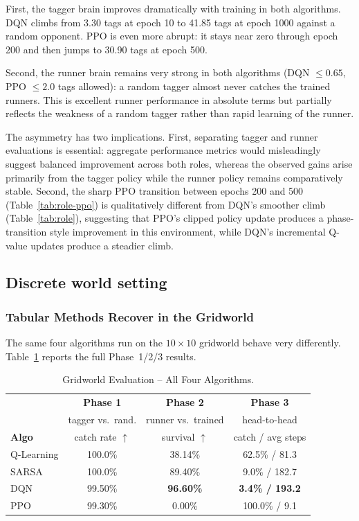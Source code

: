 \documentclass[conference]{IEEEtran}
\begin{document}
First, the tagger brain improves dramatically with training in both
algorithms. DQN climbs from 3.30 tags at epoch 10 to 41.85 tags at
epoch 1000 against a random opponent. PPO is even more abrupt: it stays near zero through epoch 200 and then jumps to 30.90 tags at epoch 500. 

Second, the runner brain remains very strong in both algorithms (DQN $\le 0.65$, PPO $\le 2.0$ tags allowed): a random tagger almost never catches the trained runners. This is excellent
runner performance in absolute terms but partially reflects the
weakness of a random tagger rather than rapid learning of the runner.

The asymmetry has two implications. First, separating tagger and runner evaluations is essential: aggregate performance metrics would misleadingly suggest balanced improvement across both roles, whereas the observed gains arise primarily from the tagger policy while the runner policy remains comparatively stable. Second, the
sharp PPO transition between epochs 200 and 500 (Table~\ref{tab:role-ppo})
is qualitatively different from DQN's smoother climb (Table~\ref{tab:role}),
suggesting that PPO's clipped policy update produces a phase-transition
style improvement in this environment, while DQN's incremental Q-value
updates produce a steadier climb.

\subsection{Discrete world setting}\label{sec:B}

\subsubsection{Tabular Methods Recover in the Gridworld}\label{sec:res-grid}

The same four algorithms run on the $10{\times}10$ gridworld behave
very differently. Table~\ref{tab:gridworld-all} reports the full
Phase~1/2/3 results.

\begin{table}[t]
\caption{Gridworld Evaluation -- All Four Algorithms.}
\label{tab:gridworld-all}
\centering
\begin{tabular}{lccc}
\toprule
              & \textbf{Phase 1} & \textbf{Phase 2}     & \textbf{Phase 3} \\
              & tagger vs.\ rand. & runner vs.\ trained & head-to-head    \\
\textbf{Algo} & catch rate $\uparrow$ & survival $\uparrow$ & catch / avg steps \\
\midrule
Q-Learning  & 100.0\%   & 38.14\%             & 62.5\% / 81.3        \\
SARSA       & 100.0\%   & 89.40\%             & 9.0\%  / 182.7       \\
DQN         & 99.50\%   & \textbf{96.60\%}    & \textbf{3.4\% / 193.2} \\
PPO         & 99.30\%   & 0.00\%              & 100.0\% / 9.1        \\
\bottomrule
\end{tabular}
\end{table}
\end{document}
